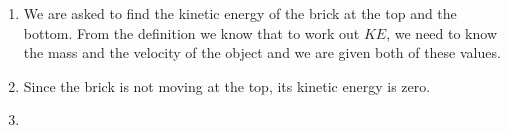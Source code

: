 {\begin{mdframed}[linewidth=4, leftmargin=40, rightmargin=40]
\begin{exercise}
\begin{enumerate}[noitemsep, label=\textbf{Step} \textbf{\arabic*}. ]
      \label{m38785*id67070}These are both in the correct units so we do not have to worry about unit
conversions.\par 
      \item  
      \label{m38785*id67078}We are asked to find the kinetic energy of the brick at the top and the bottom. From the definition we know that to work out \begin{math}KE\end{math}, we need to know the mass and the velocity of the object and we are given both of these values.\par 
      \item  
      \label{m38785*id67099}Since the brick is not moving at the top, its kinetic energy is zero.\par 
      \item  
      \label{m38785*id67107}\nopagebreak\noindent{}
\end{enumerate}
\end{exercise}
\end{mdframed}}
